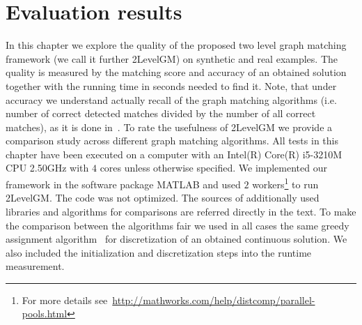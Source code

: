 \chapter{Evaluation results} \label{chapter:results}

In this chapter we explore the quality of the proposed two level graph matching framework (we call it further 2LevelGM) on synthetic and real examples. The quality is measured by the matching score and accuracy of an obtained solution together with the running time in seconds needed to find it. Note, that under accuracy we understand actually recall of the graph matching algorithms (i.e. number of correct detected matches divided by the number of all correct matches), as it is done in~\cite{Cho2014_Haystack,Cho2010_RRWM,Cho2012_ProgressiveGM,Duchenne2011,Rangarajan1996_GAGM,Leordeanu2005_SM,Leordeanu2009_IPFP}.
To rate the usefulness of 2LevelGM we provide a comparison study across different graph matching algorithms. All tests in this chapter have been executed on a computer with an Intel(R) Core(R) i5-3210M CPU 2.50GHz with $4$ cores unless otherwise specified. We implemented our framework in the software package MATLAB and used $2$ workers\footnote{For more details see~\url{http://mathworks.com/help/distcomp/parallel-pools.html}} to run 2LevelGM. The code was not optimized. The sources of additionally used libraries and algorithms for comparisons are referred directly in the text. To make the comparison between the algorithms fair we used in all cases the same greedy assignment algorithm~\cite{Leordeanu2005_SM} for discretization of an obtained continuous solution. We also included the initialization and discretization steps into the runtime measurement.

